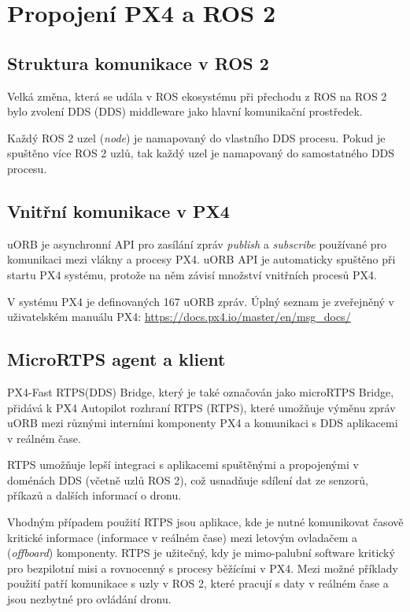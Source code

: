 \chapter{Propojení PX4 a ROS 2}

\section{Struktura komunikace v ROS 2}

Velká změna, která se udála v ROS ekosystému při přechodu z ROS na ROS 2 bylo zvolení \acs{DDS} (\acl{DDS}) middleware jako hlavní komunikační prostředek.

Každý ROS 2 uzel (\textit{node}) je namapovaný do vlastního \acs{DDS} procesu. Pokud je spuštěno více ROS 2 uzlů, tak každý uzel je namapovaný do samostatného \acs{DDS} procesu. \cite{ROS2DDS3}

\section{Vnitřní komunikace v PX4}

uORB je asynchronní \acs{API} pro zasílání zpráv \textit{publish} a \textit{subscribe} používané pro komunikaci mezi vlákny a procesy PX4. uORB \acs{API} je automaticky spuštěno při startu PX4 systému, protože na něm závisí množství vnitřních procesů PX4. \cite{UORB1}

V systému PX4 je definovaných 167 uORB zpráv. Úplný seznam je zveřejněný v uživatelském manuálu PX4: \url{https://docs.px4.io/master/en/msg_docs/} \cite{UORBlist}

\section{MicroRTPS agent a klient}

PX4-Fast RTPS(DDS) Bridge, který je také označován jako microRTPS Bridge, přidává k PX4 Autopilot rozhraní \acs{RTPS} (\acl{RTPS}), které umožňuje výměnu zpráv uORB mezi různými interními komponenty PX4 a  komunikaci s \acs{DDS} aplikacemi v reálném čase.

\acs{RTPS} umožňuje lepší integraci s aplikacemi spuštěnými a propojenými v doménách \acs{DDS} (včetně uzlů ROS 2), což usnadňuje sdílení dat ze senzorů, příkazů a dalších informací o dronu. \cite{UORB2}

Vhodným případem použití \acs{RTPS} jsou aplikace, kde je nutné komunikovat časově kritické informace (informace v reálném čase) mezi letovým ovladačem a  (\textit{offboard}) komponenty. \acs{RTPS} je užitečný, kdy je mimo-palubní software kritický pro bezpilotní misi a rovnocenný s procesy běžícími v PX4. Mezi možné příklady použití patří komunikace s uzly v ROS 2, které pracují s daty v reálném čase a jsou nezbytné pro ovládání dronu.

